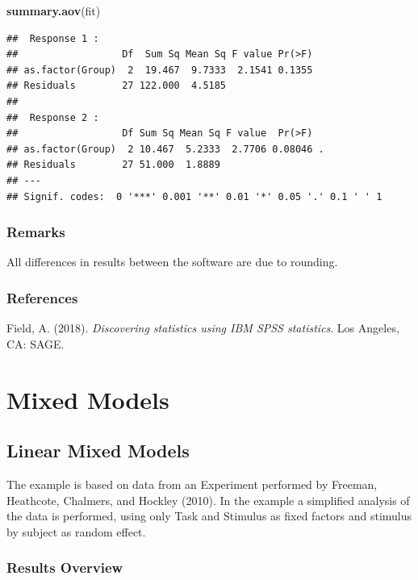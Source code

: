 \documentclass[
]{book}
\newenvironment{Shaded}{\begin{snugshade}}{\end{snugshade}}
\newcommand{\KeywordTok}[1]{\textcolor[rgb]{0.13,0.29,0.53}{\textbf{#1}}}
\newcommand{\NormalTok}[1]{#1}
\begin{document}
\begin{Shaded}
\begin{Highlighting}[]
\KeywordTok{summary.aov}\NormalTok{(fit)}
\end{Highlighting}
\end{Shaded}

\begin{verbatim}
##  Response 1 :
##                  Df  Sum Sq Mean Sq F value Pr(>F)
## as.factor(Group)  2  19.467  9.7333  2.1541 0.1355
## Residuals        27 122.000  4.5185               
## 
##  Response 2 :
##                  Df Sum Sq Mean Sq F value  Pr(>F)  
## as.factor(Group)  2 10.467  5.2333  2.7706 0.08046 .
## Residuals        27 51.000  1.8889                  
## ---
## Signif. codes:  0 '***' 0.001 '**' 0.01 '*' 0.05 '.' 0.1 ' ' 1
\end{verbatim}

\hypertarget{remarks-6}{%
\subsection{Remarks}\label{remarks-6}}

All differences in results between the software are due to rounding.

\hypertarget{references-6}{%
\subsection{References}\label{references-6}}

Field, A. (2018). \emph{Discovering statistics using IBM SPSS statistics}. Los Angeles, CA: SAGE.

\hypertarget{mixed-models}{%
\chapter{Mixed Models}\label{mixed-models}}

\hypertarget{linear-mixed-models}{%
\section{Linear Mixed Models}\label{linear-mixed-models}}

The example is based on data from an Experiment performed by Freeman, Heathcote, Chalmers, and Hockley (2010). In the example a simplified analysis of the data is performed, using only Task and Stimulus as fixed factors and stimulus by subject as random effect.

\hypertarget{results-overview}{%
\subsection{Results Overview}\label{results-overview}}
\end{document}
